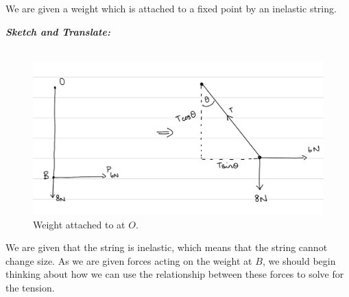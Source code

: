 %
%
%


\begin{subquestions}
	
\subquestion
We are given a weight which is attached to a fixed point by an inelastic string.

\begin{subsubquestions}
	
\subsubquestion

\textbf{\textit{Sketch and Translate:}} \\ \\
\begin{figure}[H]
	\begin{center}
		\includegraphics[scale=0.25]{../2010/figures/2010q6-1}
		\caption{\label{2010:q6:Sketch1} Weight attached to at $O$.}
	\end{center}
\end{figure}
We are given that the string is inelastic, which means that the string cannot change size. As we are given forces acting on the weight at $B$, we should begin thinking about how we can use the relationship between these forces to solve for the tension.





\end{subsubquestions}
\end{subquestions}
